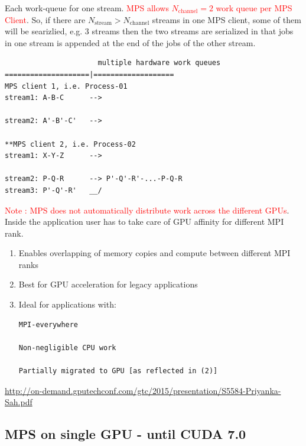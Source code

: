 Each work-queue for one stream.
\textcolor{red}{MPS allows $N_\text{channel}=2$  work queue per MPS Client}. So,
if there are $N_\text{stream}>N_\text{channel}$ streams in one MPS client, some
of them will be searizlied, e.g. 3 streams then the two streams are serialized
in that jobs in one stream is appended at the end of the jobs of the other
stream.

\begin{verbatim}
                      multiple hardware work queues
====================|===================
MPS client 1, i.e. Process-01
stream1: A-B-C      --> 

stream2: A'-B'-C'   --> 

**MPS client 2, i.e. Process-02
stream1: X-Y-Z      --> 

stream2: P-Q-R      --> P'-Q'-R'-...-P-Q-R 
stream3: P'-Q'-R'   __/ 

\end{verbatim}


\textcolor{red}{Note : MPS does not automatically distribute work across the
different GPUs}. Inside the application user has to take care of GPU affinity
for different MPI rank.
\begin{enumerate}
  \item  Enables overlapping of memory copies and compute between different MPI ranks
  
  \item Best for GPU acceleration for legacy applications
  
  \item Ideal for applications with:
  \begin{verbatim}
MPI-everywhere 

Non-negligible CPU work

Partially migrated to GPU [as reflected in (2)]
  \end{verbatim}
\end{enumerate}
\url{http://on-demand.gputechconf.com/gtc/2015/presentation/S5584-Priyanka-Sah.pdf}

\subsection{MPS on single GPU - until CUDA 7.0}

